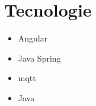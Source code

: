 \chapter{Tecnologie}\label{tecnologie}

\begin{itemize}
    \item Angular
    \item Java Spring
    \item mqtt
    \item Java
\end{itemize}